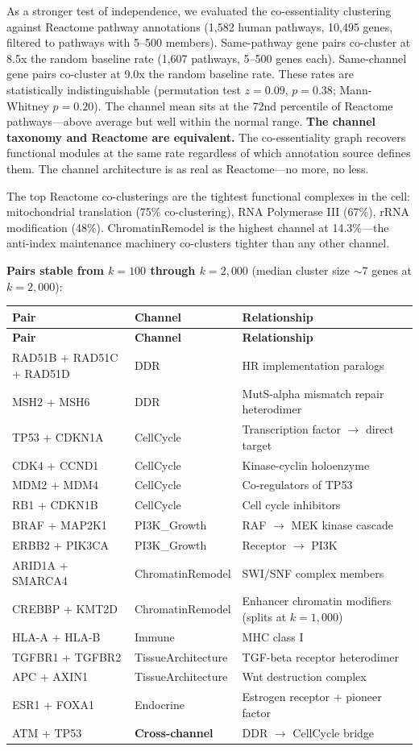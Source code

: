 \documentclass[11pt]{article}
\theoremstyle{definition}
\begin{document}
As a stronger test of independence, we evaluated the co-essentiality clustering against Reactome pathway annotations (1,582 human pathways, 10,495 genes, filtered to pathways with 5--500 members). Same-pathway gene pairs co-cluster at 8.5x the random baseline rate (1,607 pathways, 5--500 genes each). Same-channel gene pairs co-cluster at 9.0x the random baseline rate. These rates are statistically indistinguishable (permutation test $z = 0.09$, $p = 0.38$; Mann-Whitney $p = 0.20$). The channel mean sits at the 72nd percentile of Reactome pathways---above average but well within the normal range. \textbf{The channel taxonomy and Reactome are equivalent.} The co-essentiality graph recovers functional modules at the same rate regardless of which annotation source defines them. The channel architecture is as real as Reactome---no more, no less.

The top Reactome co-clusterings are the tightest functional complexes in the cell: mitochondrial translation (75\% co-clustering), RNA Polymerase III (67\%), rRNA modification (48\%). ChromatinRemodel is the highest channel at 14.3\%---the anti-index maintenance machinery co-clusters tighter than any other channel.

\textbf{Pairs stable from $k{=}100$ through $k{=}2{,}000$} (median cluster size $\sim$7 genes at $k{=}2{,}000$):

\begin{longtable}{p{4.5cm} p{2.5cm} p{6cm}}
\toprule
\textbf{Pair} & \textbf{Channel} & \textbf{Relationship} \\
\midrule
\endfirsthead
\toprule
\textbf{Pair} & \textbf{Channel} & \textbf{Relationship} \\
\midrule
\endhead
RAD51B + RAD51C + RAD51D & DDR & HR implementation paralogs \\
MSH2 + MSH6 & DDR & MutS-alpha mismatch repair heterodimer \\
TP53 + CDKN1A & CellCycle & Transcription factor $\to$ direct target \\
CDK4 + CCND1 & CellCycle & Kinase-cyclin holoenzyme \\
MDM2 + MDM4 & CellCycle & Co-regulators of TP53 \\
RB1 + CDKN1B & CellCycle & Cell cycle inhibitors \\
BRAF + MAP2K1 & PI3K\_Growth & RAF $\to$ MEK kinase cascade \\
ERBB2 + PIK3CA & PI3K\_Growth & Receptor $\to$ PI3K \\
ARID1A + SMARCA4 & ChromatinRemodel & SWI/SNF complex members \\
CREBBP + KMT2D & ChromatinRemodel & Enhancer chromatin modifiers (splits at $k{=}1{,}000$) \\
HLA-A + HLA-B & Immune & MHC class I \\
TGFBR1 + TGFBR2 & TissueArchitecture & TGF-beta receptor heterodimer \\
APC + AXIN1 & TissueArchitecture & Wnt destruction complex \\
ESR1 + FOXA1 & Endocrine & Estrogen receptor + pioneer factor \\
ATM + TP53 & \textbf{Cross-channel} & DDR $\to$ CellCycle bridge \\
\bottomrule
\end{longtable}
\end{document}
